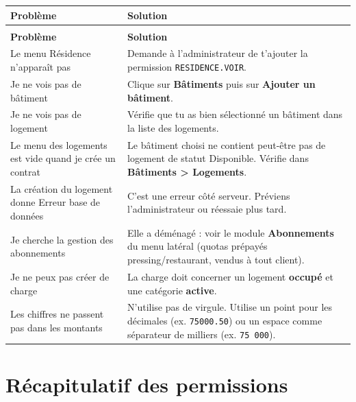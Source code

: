 \documentclass[12pt,a4paper]{article}
\begin{document}
\begin{longtable}{>{\raggedright}p{5cm} p{9cm}}
\toprule
\textbf{Problème} & \textbf{Solution} \\
\midrule
\endfirsthead
\multicolumn{2}{c}{\textit{Suite de la FAQ}} \\
\toprule
\textbf{Problème} & \textbf{Solution} \\
\midrule
\endhead
\bottomrule
\endfoot

Le menu Résidence n'apparaît pas & Demande à l'administrateur de t'ajouter la permission \texttt{RESIDENCE.VOIR}. \\

Je ne vois pas de bâtiment & Clique sur \textbf{Bâtiments} puis sur \textbf{Ajouter un bâtiment}. \\

Je ne vois pas de logement & Vérifie que tu as bien sélectionné un bâtiment dans la liste des logements. \\

Le menu des logements est vide quand je crée un contrat & Le bâtiment choisi ne contient peut-être pas de logement de statut \og{}Disponible\fg{}. Vérifie dans \textbf{Bâtiments > Logements}. \\

La création du logement donne \og{}Erreur base de données\fg{} & C'est une erreur côté serveur. Préviens l'administrateur ou réessaie plus tard. \\

Je cherche la gestion des abonnements & Elle a déménagé : voir le module \textbf{Abonnements} du menu latéral (quotas prépayés pressing/restaurant, vendus à tout client). \\

Je ne peux pas créer de charge & La charge doit concerner un logement \textbf{occupé} et une catégorie \textbf{active}. \\

Les chiffres ne passent pas dans les montants & N'utilise pas de virgule. Utilise un point pour les décimales (ex. \texttt{75000.50}) ou un espace comme séparateur de milliers (ex. \texttt{75 000}). \\

\bottomrule
\end{longtable}

\newpage

\section{Récapitulatif des permissions}
\end{document}
